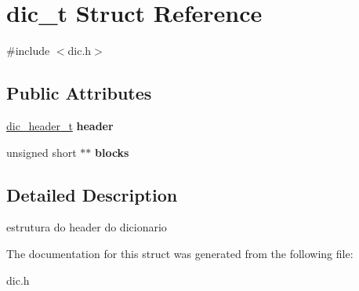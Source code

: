 \hypertarget{structdic__t}{}\section{dic\+\_\+t Struct Reference}
\label{structdic__t}


{\ttfamily \#include $<$dic.\+h$>$}

\subsection*{Public Attributes}
\begin{DoxyCompactItemize}
\item 
\hypertarget{structdic__t_ae208f948090e37ce92a38756c20ff9e1}{}\hyperlink{structdic__header__t}{dic\+\_\+header\+\_\+t} {\bfseries header}\label{structdic__t_ae208f948090e37ce92a38756c20ff9e1}

\item 
\hypertarget{structdic__t_a1c73a169d41b044b1ec4fd2fff613847}{}unsigned short $\ast$$\ast$ {\bfseries blocks}\label{structdic__t_a1c73a169d41b044b1ec4fd2fff613847}

\end{DoxyCompactItemize}


\subsection{Detailed Description}
estrutura do header do dicionario 

The documentation for this struct was generated from the following file\+:\begin{DoxyCompactItemize}
\item 
dic.\+h\end{DoxyCompactItemize}
